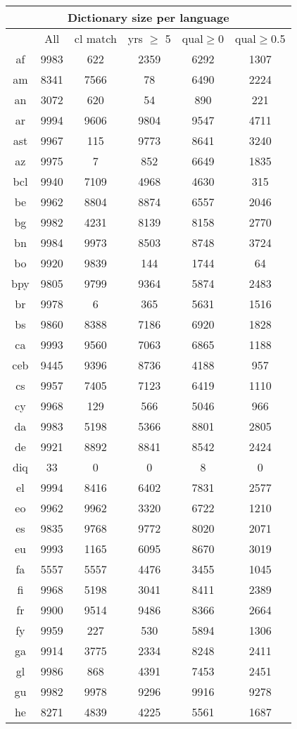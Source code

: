 \begin{figure}[h]
\centering
\begin{tabular}{cccccc}
\multicolumn{6}{c}{Dictionary size per language}\\
\hline\hline
&All&cl match&yrs $\geq$ 5&qual$\geq$0&qual$\geq$0.5\\
\hline\hline
af&9983&622&2359&6292&1307\\
am&8341&7566&78&6490&2224\\
an&3072&620&54&890&221\\
ar&9994&9606&9804&9547&4711\\
ast&9967&115&9773&8641&3240\\
az&9975&7&852&6649&1835\\
bcl&9940&7109&4968&4630&315\\
be&9962&8804&8874&6557&2046\\
bg&9982&4231&8139&8158&2770\\
bn&9984&9973&8503&8748&3724\\
bo&9920&9839&144&1744&64\\
bpy&9805&9799&9364&5874&2483\\
br&9978&6&365&5631&1516\\
bs&9860&8388&7186&6920&1828\\
ca&9993&9560&7063&6865&1188\\
ceb&9445&9396&8736&4188&957\\
cs&9957&7405&7123&6419&1110\\
cy&9968&129&566&5046&966\\
da&9983&5198&5366&8801&2805\\
de&9921&8892&8841&8542&2424\\
diq&33&0&0&8&0\\
el&9994&8416&6402&7831&2577\\
eo&9962&9962&3320&6722&1210\\
es&9835&9768&9772&8020&2071\\
eu&9993&1165&6095&8670&3019\\
fa&5557&5557&4476&3455&1045\\
fi&9968&5198&3041&8411&2389\\
fr&9900&9514&9486&8366&2664\\
fy&9959&227&530&5894&1306\\
ga&9914&3775&2334&8248&2411\\
gl&9986&868&4391&7453&2451\\
gu&9982&9978&9296&9916&9278\\
he&8271&4839&4225&5561&1687\\

\end{tabular}
\end{figure}
